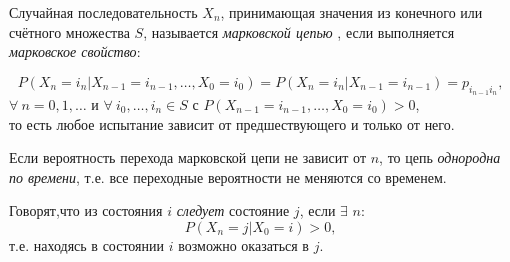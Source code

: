 \documentclass[14pt,a4paper]{article}
\begin{document}
  Случайная последовательность $X_n$, принимающая значения из конечного или счётного множества $S$, называется \textit{марковской цепью} \cite{fell}, если выполняется \textit{марковское свойство}:


\begin{equation}
P(X_n = i_n|X_{n-1} = i_{n-1},\dots, X_{0}=i_{0}) = P(X_n = i_n|X_{n-1} = i_{n-1})= p_{i_{n-1} i_n},
\end{equation}	
$\forall \ n = 0, 1,\dots$ и $\forall \ i_0,\dots, i_n \in S$ с $P(X_{n-1} = i_{n-1},\dots, X_{0}=i_{0})>0$,
\\то есть любое испытание зависит от предшествующего и только от него.


Если вероятность перехода марковской цепи не зависит от $n$, то цепь \textit{однородна по времени}, т.е. все переходные вероятности не меняются со временем.


Говорят,что из состояния $i$ \textit{следует} состояние $j$, если $\exists$ $n :$ \begin{equation}P(X_n = j|X_0 = i)>0,\end{equation}  
т.е. находясь в состоянии $i$ возможно оказаться в $j$.
\end{document}
